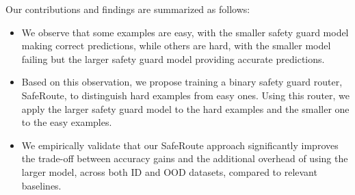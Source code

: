 Our contributions and findings are summarized as follows:
\begin{itemize}
[itemsep=1mm,parsep=1pt,topsep=2pt,leftmargin=*]

\item We observe that some examples are easy, with the smaller safety guard model making correct predictions, while others are hard, with the smaller model failing but the larger safety guard model providing accurate predictions.

\item Based on this observation, we propose training a binary safety guard router, SafeRoute, to distinguish hard examples from easy ones. Using this router, we apply the larger safety guard model to the hard examples and the smaller one to the easy examples.


\item We empirically validate that our SafeRoute approach significantly improves the trade-off between accuracy gains and the additional overhead of using the larger model, across both ID and OOD datasets, compared to relevant baselines.

\end{itemize}